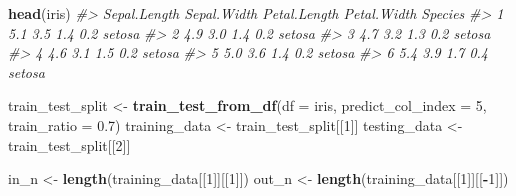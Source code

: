 \documentclass[]{book}
\newenvironment{Shaded}{\begin{snugshade}}{\end{snugshade}}
\newcommand{\CommentTok}[1]{\textcolor[rgb]{0.56,0.35,0.01}{\textit{#1}}}
\newcommand{\DataTypeTok}[1]{\textcolor[rgb]{0.13,0.29,0.53}{#1}}
\newcommand{\DecValTok}[1]{\textcolor[rgb]{0.00,0.00,0.81}{#1}}
\newcommand{\FloatTok}[1]{\textcolor[rgb]{0.00,0.00,0.81}{#1}}
\newcommand{\KeywordTok}[1]{\textcolor[rgb]{0.13,0.29,0.53}{\textbf{#1}}}
\newcommand{\NormalTok}[1]{#1}
\newcommand{\OperatorTok}[1]{\textcolor[rgb]{0.81,0.36,0.00}{\textbf{#1}}}
\newcommand{\StringTok}[1]{\textcolor[rgb]{0.31,0.60,0.02}{#1}}
\begin{document}
\begin{Shaded}
\begin{Highlighting}[]
\KeywordTok{head}\NormalTok{(iris)}
\CommentTok{#>   Sepal.Length Sepal.Width Petal.Length Petal.Width Species}
\CommentTok{#> 1          5.1         3.5          1.4         0.2  setosa}
\CommentTok{#> 2          4.9         3.0          1.4         0.2  setosa}
\CommentTok{#> 3          4.7         3.2          1.3         0.2  setosa}
\CommentTok{#> 4          4.6         3.1          1.5         0.2  setosa}
\CommentTok{#> 5          5.0         3.6          1.4         0.2  setosa}
\CommentTok{#> 6          5.4         3.9          1.7         0.4  setosa}
\end{Highlighting}
\end{Shaded}

\begin{Shaded}
\begin{Highlighting}[]
\NormalTok{train_test_split <-}\StringTok{ }\KeywordTok{train_test_from_df}\NormalTok{(}\DataTypeTok{df =}\NormalTok{ iris, }\DataTypeTok{predict_col_index =} \DecValTok{5}\NormalTok{, }\DataTypeTok{train_ratio =} \FloatTok{0.7}\NormalTok{)}
\NormalTok{training_data <-}\StringTok{ }\NormalTok{train_test_split[[}\DecValTok{1}\NormalTok{]]}
\NormalTok{testing_data <-}\StringTok{ }\NormalTok{train_test_split[[}\DecValTok{2}\NormalTok{]]}

\NormalTok{in_n <-}\StringTok{ }\KeywordTok{length}\NormalTok{(training_data[[}\DecValTok{1}\NormalTok{]][[}\DecValTok{1}\NormalTok{]])}
\NormalTok{out_n <-}\StringTok{ }\KeywordTok{length}\NormalTok{(training_data[[}\DecValTok{1}\NormalTok{]][[}\OperatorTok{-}\DecValTok{1}\NormalTok{]])}


\end{Highlighting}
\end{Shaded}
\end{document}
